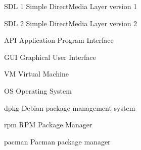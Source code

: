 \begin{siglas}
  \item[SDL 1] Simple DirectMedia Layer version 1
  \item[SDL 2] Simple DirectMedia Layer version 2
  \item[API] Application Program Interface
  \item[GUI] Graphical User Interface
  \item[VM] Virtual Machine
  \item[OS] Operating System
  \item[dpkg] Debian package management system
  \item[rpm] RPM Package Manager
  \item[pacman] Pacman package manager
\end{siglas}
